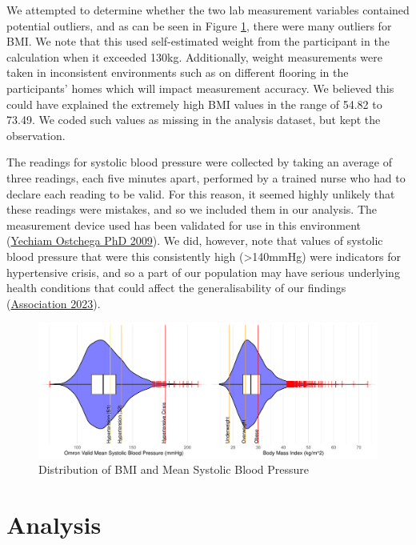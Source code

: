 \documentclass[
  11pt,
  twocolumn]{article}
\begin{document}
We attempted to determine whether the two lab measurement variables
contained potential outliers, and as can be seen in Figure
\ref{fig:output-distribution-plots}, there were many outliers for BMI.
We note that this used self-estimated weight from the participant in the
calculation when it exceeded 130kg. Additionally, weight measurements
were taken in inconsistent environments such as on different flooring in
the participants' homes which will impact measurement accuracy. We
believed this could have explained the extremely high BMI values in the
range of 54.82 to 73.49. We coded such values as missing in the analysis
dataset, but kept the observation.

The readings for systolic blood pressure were collected by taking an
average of three readings, each five minutes apart, performed by a
trained nurse who had to declare each reading to be valid. For this
reason, it seemed highly unlikely that these readings were mistakes, and
so we included them in our analysis. The measurement device used has
been validated for use in this environment
(\protect\hyperlink{ref-Omron}{Yechiam Ostchega PhD 2009}). We did,
however, note that values of systolic blood pressure that were this
consistently high (\textgreater140mmHg) were indicators for hypertensive
crisis, and so a part of our population may have serious underlying
health conditions that could affect the generalisability of our findings
(\protect\hyperlink{ref-heart}{Association 2023}).

\begin{figure}[H]
\includegraphics{Coursework_files/figure-latex/output-distribution-plots-1} \caption{Distribution of BMI and Mean Systolic Blood Pressure}\label{fig:output-distribution-plots}
\end{figure}

\hypertarget{analysis}{%
\section{Analysis}\label{analysis}}
\end{document}
